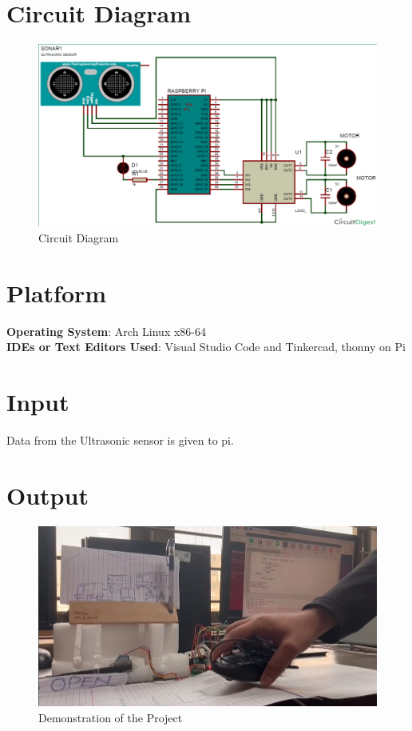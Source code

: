 \documentclass[11pt]{article}
\begin{document}
\section{Circuit Diagram}
\begin{figure}[H]
	\centering
	\includegraphics[width=.95\textwidth]{Screenshot_on_2023-05-01_at_22-55-37.png}
	\caption{Circuit Diagram}
\end{figure}

\section{Platform}
\textbf{Operating System}: Arch Linux x86-64 \\
\textbf{IDEs or Text Editors Used}: Visual Studio Code and Tinkercad, thonny on Pi\\

\section{Input}
Data from the Ultrasonic sensor is given to pi.
\section{Output}
\begin{figure}[H]
	\centering
	\includegraphics[width=.95\textwidth]{WhatsApp Image 2023-05-01 at 17.24.16.jpeg}
	\caption{Demonstration of the Project}
\end{figure}
\end{document}
